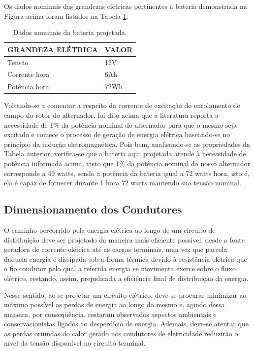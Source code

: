 Os dados nominais das grandezas elétricas pertinentes à bateria demonstrada na Figura acima foram listados na Tabela \ref{dados-bateria}.


\begin{table}[h]
\centering
\begin{tabular}{|l|l|}
\hline
\rowcolor[HTML]{329A9D} 
GRANDEZA ELÉTRICA                                                    & VALOR                                                   \\ \hline
Tensão& 12V 
\\ \hline
Corrente hora & 6Ah
\\ \hline
Potência hora  & 72Wh
\\ \hline
\end{tabular}
\caption{Dados nominais da bateria projetada.}
\label{dados-bateria}
\end{table}

Voltando-se a comentar a respeito da corrente de excitação do enrolamento de campo do rotor do alternador, foi dito acima que a literatura reporta a necessidade de 1\% da potência nominal do alternador para que o mesmo seja excitado e comece o processo de geração de energia elétrica baseando-se no princípio da indução eletromagnética. Pois bem, analisando-se as propriedades da Tabela anterior, verifica-se que a bateria aqui projetada atende à necessidade de potência informada acima, visto que 1\% da potência nominal do nosso alternador corresponde a 49 watts, sendo a potência da bateria igual a 72 watts hora, isto é, ela é capaz de fornecer durante 1 hora 72 watts mantendo sua tensão nominal.

\subsection{Dimensionamento dos Condutores}

O caminho percorrido pela energia elétrica ao longo de um circuito de distribuição deve ser projetado da maneira mais eficiente possível, desde a fonte geradora de corrente elétrica até as cargas terminais, uma vez que parcela daquela energia é dissipada sob a forma térmica devido à resistência elétrica que o fio condutor pelo qual a referida energia se movimenta exerce sobre o fluxo elétrico, restando, assim, prejudicada a eficiência final de distribuição da energia.

Nesse sentido, ao se projetar um circuito elétrico, deve-se procurar minimizar ao máximo possível as perdas de energia ao longo do mesmo e, agindo dessa maneira, por conseqüência, restaram observados aspectos ambientais e conservacionistas ligados ao desperdício de energia. Ademais, deve-se atentar que as perdas oriundas do calor gerado nos condutores de eletricidade reduzirão o nível da tensão disponível no circuito terminal.


